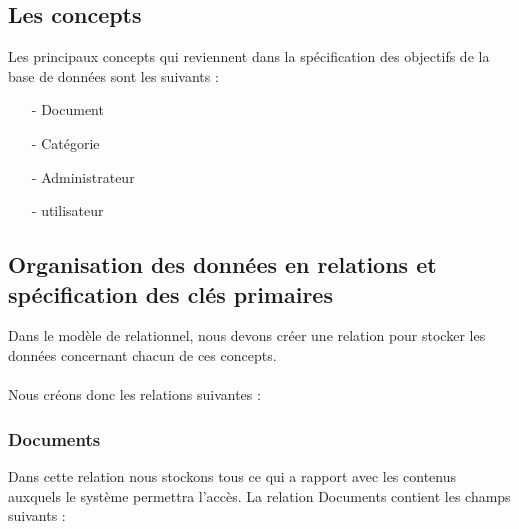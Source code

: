		\subsection{Les concepts}
			Les principaux concepts qui reviennent dans la sp\'ecification des objectifs de la base de donn\'ees sont les suivants :
			\begin{itemize}
				\item[-] Document
				\item[-] Cat\'egorie
				\item[-] Administrateur
				\item[-] utilisateur
			\end{itemize}



		\subsection{Organisation des donn\'ees en relations et sp\'ecification des cl\'es primaires}
			Dans le mod\`ele de relationnel, nous devons cr\'eer une relation pour stocker les donn\'ees concernant chacun de ces concepts.

			\paragraph{}Nous cr\'eons donc les relations suivantes :

				\subsubsection{Documents}
				\label{SectionRelationDocuments}
					Dans cette relation nous stockons tous ce qui a rapport avec les contenus auxquels le syst\`eme permettra l'acc\`es. La relation Documents contient les champs suivants :\\


